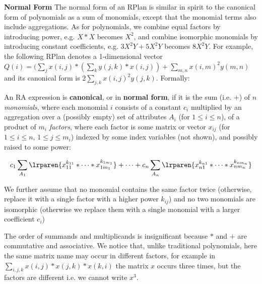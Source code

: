 {\bf Normal Form} The normal form of an RPlan is similar in spirit to
the canonical form of polynomials as a sum of monomials, except that
the monomial terms also include aggregations.  As for polynomials, we
combine equal factors by introducing power, e.g. $X * X$ becomes
$X^2$, and combine isomorphic monomials by introducing constant
coefficients, e.g. $3X^2Y+5X^2Y$ becomes $8X^2Y$.  For example, the
following RPlan denotes a 1-dimensional vector
$Q(i) = (\sum_j x(i,j) * (\sum_k y(j,k)*x(i,j)) + \sum_{m,n} x(i,m)^2
y(m,n)$ and its canonical form is $2 \sum_{j,k} x(i,j)^2y(j,k)$.
Formally:

% 
% 
% 

\begin{definition}
  An RA expression is \textbf{canonical}, or in \textbf{normal form},
  if it is the sum (i.e. $+$) of $n$ {\em monomials}, where each
  monomial $i$ consists of a constant $c_i$ multiplied by an
  aggregation over a (possibly empty) set of attributes $A_i$ (for
  $1 \leq i \leq n$), of a product of $m_i$ {\em factors}, where each
  factor is some matrix or vector $x_{ij}$ (for $1 \leq i \leq n$,
  $1 \leq j \leq m_i$) indexed by some index variables (not shown),
  and possibly raised to some power:

\[c_1 \sum_{A_1} \lrparen{x_{11}^{k_{11}} * \dots * x_{1m_1}^{k_{1m_1}}} %
+ \dots + c_n \sum_{A_n} \lrparen{x_{n1}^{k_{n1}} * \dots * x_{nm_n}^{k_{nm_n}}}\]

We further assume that no monomial contains the same factor twice
(otherwise, replace it with a single factor with a higher power
$k_{ij}$) and no two monomials are isomorphic (otherwise we replace
them with a single monomial with a larger coefficient $c_i$)
% 
% 
\end{definition}
The order of summands and multiplicands is insignificant because $*$
and $+$ are commutative and associative.  We notice that, unlike
traditional polynomials, here the same matrix name may occur in
different factors, for example in $\sum_{i,j,k} x(i,j)*x(j,k)*x(k,i)$
the matrix $x$ occurs three times, but the factors are different
i.e. we cannot write $x^3$.

